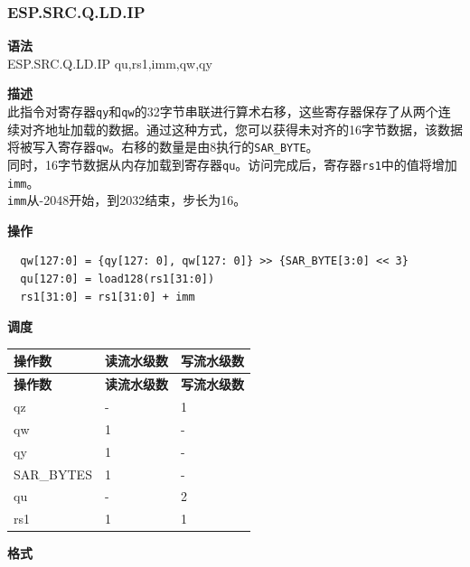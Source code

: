 \newpage
\subsubsection{ESP.SRC.Q.LD.IP}\label{instruction:ESPSRCQLDIP}
\textbf{语法}\\
ESP.SRC.Q.LD.IP qu,rs1,imm,qw,qy

\textbf{描述}\\
此指令对寄存器\lstinline{qy}和\lstinline{qw}的32字节串联进行算术右移，这些寄存器保存了从两个连续对齐地址加载的数据。通过这种方式，您可以获得未对齐的16字节数据，该数据将被写入寄存器\lstinline{qw}。右移的数量是由8执行的\lstinline{SAR_BYTE}。\\
同时，16字节数据从内存加载到寄存器\lstinline{qu}。访问完成后，寄存器\lstinline{rs1}中的值将增加\lstinline{imm}。\\

\lstinline{imm}从-2048开始，到2032结束，步长为16。

\textbf{操作}
\begin{lstlisting}
  qw[127:0] = {qy[127: 0], qw[127: 0]} >> {SAR_BYTE[3:0] << 3}
  qu[127:0] = load128(rs1[31:0])
  rs1[31:0] = rs1[31:0] + imm
\end{lstlisting}

\textbf{调度}\\
\begin{longtable}[c]{|l|l|l|}
    \hline
    \rowcolor{lightgray}
    \textbf{操作数} & \textbf{读流水级数} & \textbf{写流水级数} \\\hline
    \endfirsthead
    \hline
    \rowcolor{lightgray}
     \textbf{操作数} & \textbf{读流水级数} & \textbf{写流水级数} \\\hline
    \endhead
    \hline
    \endfoot

  qz & - & 1 \\\hline
  qw & 1 & - \\\hline
  qy & 1 & - \\\hline
  SAR\_BYTES & 1 & - \\\hline
  qu & - & 2 \\\hline
  rs1 & 1 & 1

\end{longtable}

\textbf{格式}\\

